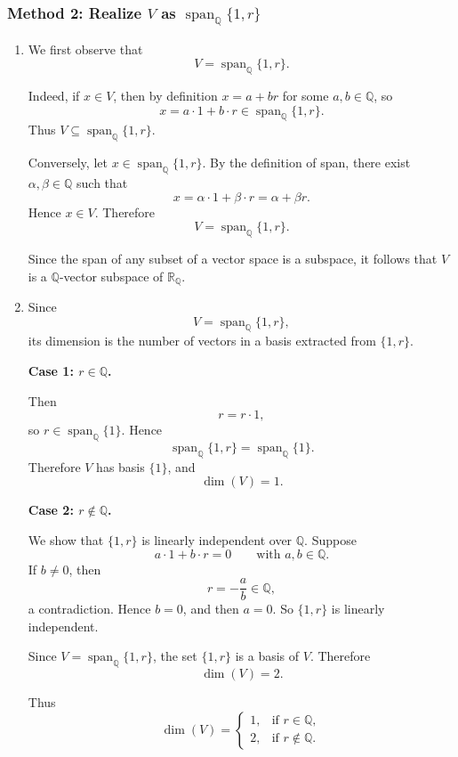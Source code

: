 \documentclass[12pt]{article}
\newcommand{\Q}{\mathbb{Q}}
\newcommand{\R}{\mathbb{R}}
\newcommand{\dimn}{\operatorname{dim}}
\begin{document}
\subsubsection{Method 2: Realize \(V\) as \(\operatorname{span}_{\Q}\{1,r\}\)}
\begin{enumerate}[label=(\alph*)]
\item We first observe that
\[
V=\operatorname{span}_{\Q}\{1,r\}.
\]

Indeed, if \(x\in V\), then by definition \(x=a+br\) for some \(a,b\in\Q\), so
\[
x=a\cdot 1+b\cdot r\in \operatorname{span}_{\Q}\{1,r\}.
\]
Thus \(V\subseteq \operatorname{span}_{\Q}\{1,r\}\).

Conversely, let \(x\in \operatorname{span}_{\Q}\{1,r\}\). By the definition of span, there exist \(\alpha,\beta\in\Q\) such that
\[
x=\alpha\cdot 1+\beta\cdot r=\alpha+\beta r.
\]
Hence \(x\in V\). Therefore
\[
V=\operatorname{span}_{\Q}\{1,r\}.
\]

Since the span of any subset of a vector space is a subspace, it follows that \(V\) is a \(\Q\)-vector subspace of \(\R_{\Q}\).

\item Since
\[
V=\operatorname{span}_{\Q}\{1,r\},
\]
its dimension is the number of vectors in a basis extracted from \(\{1,r\}\).

\textbf{Case 1: \(r\in\Q\).}

Then
\[
r=r\cdot 1,
\]
so \(r\in \operatorname{span}_{\Q}\{1\}\). Hence
\[
\operatorname{span}_{\Q}\{1,r\}=\operatorname{span}_{\Q}\{1\}.
\]
Therefore \(V\) has basis \(\{1\}\), and
\[
\dimn(V)=1.
\]

\textbf{Case 2: \(r\notin\Q\).}

We show that \(\{1,r\}\) is linearly independent over \(\Q\). Suppose
\[
a\cdot 1+b\cdot r=0
\qquad\text{with } a,b\in\Q.
\]
If \(b\neq 0\), then
\[
r=-\frac{a}{b}\in\Q,
\]
a contradiction. Hence \(b=0\), and then \(a=0\). So \(\{1,r\}\) is linearly independent.

Since \(V=\operatorname{span}_{\Q}\{1,r\}\), the set \(\{1,r\}\) is a basis of \(V\). Therefore
\[
\dimn(V)=2.
\]

Thus
\[
\boxed{
\dimn(V)=
\begin{cases}
1, & \text{if } r\in\Q,\\[1mm]
2, & \text{if } r\notin\Q.
\end{cases}}
\]
\end{enumerate}
\end{document}

